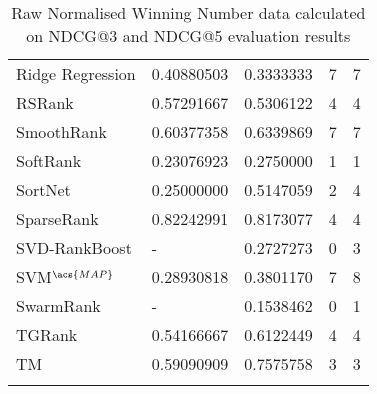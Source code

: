 \begin{longtable}{l|p{2.3cm}|p{2.3cm}|p{2.3cm}|p{2.33cm}}
Ridge Regression & 0.40880503 & 0.3333333 & 7 & 7 \\ 
RSRank & 0.57291667 & 0.5306122 & 4 & 4 \\ 
SmoothRank & 0.60377358 & 0.6339869 & 7 & 7 \\ 
SoftRank & 0.23076923 & 0.2750000 & 1 & 1 \\ 
SortNet & 0.25000000 & 0.5147059 & 2 & 4 \\ 
SparseRank & 0.82242991 & 0.8173077 & 4 & 4 \\
\acs{SVD}-RankBoost & - & 0.2727273 & 0 & 3 \\ 
\acs{SVM}$^{\acs{MAP}}$ & 0.28930818 & 0.3801170 & 7 & 8 \\
SwarmRank & - & 0.1538462 & 0 & 1 \\ 
TGRank & 0.54166667 & 0.6122449 & 4 & 4 \\ 
TM & 0.59090909 & 0.7575758 & 3 & 3 \\
\caption{Raw Normalised Winning Number data calculated on \acs{NDCG}@3 and \acs{NDCG}@5 evaluation results}
\label{tab:raw_data_norm_winnum_ndcg35}
\end{longtable}